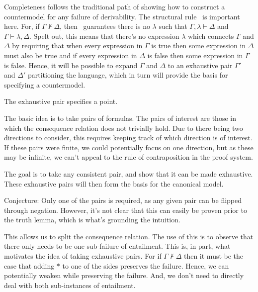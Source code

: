 \documentclass[10pt]{article}
\begin{document}
Completeness follows the traditional path of showing how to construct a countermodel for any failure of derivability.
The structural rule \ is important here.
For, if \(\Gamma \nvdash \Delta\), then \ guarantees there is no \(\lambda\) such that \(\Gamma,\lambda \vdash \Delta\) and \(\Gamma \vdash \lambda,\Delta\).
Spelt out, this means that there's no expression \(\lambda\) which connects \(\Gamma\) and \(\Delta\) by requiring that when every expression in \(\Gamma\) is true then some expression in \(\Delta\) must also be true and if every expression in \(\Delta\) is false then some expression in \(\Gamma\) is false.
Hence, it will be possible to expand \(\Gamma\) and \(\Delta\) to an exhaustive pair \(\Gamma'\) and \(\Delta'\) partitioning the language, which in turn will provide the basis for specifying a countermodel.



The exhaustive pair specifies a point.

\begin{note}
  The basic idea is to take pairs of formulas. The pairs of interest are those in which the consequence relation does not trivially hold. Due to there being two directions to consider, this requires keeping track of which direction is of interest. If these pairs were finite, we could potentially focus on one direction, but as these may be infinite, we can't appeal to the rule of contraposition in the proof system.

  The goal is to take any consistent pair, and show that it can be made exhaustive. These exhaustive pairs will then form the basis for the canonical model.

  Conjecture: Only one of the pairs is required, as any given pair can be flipped through negation. However, it's not clear that this can easily be proven prior to the truth lemma, which is what's grounding the intuition.
\end{note}






This allows us to split the consequence relation.
The use of this is to observe that there only needs to be one sub-failure of entailment.
This is, in part, what motivates the idea of taking exhaustive pairs.
For if \(\Gamma \nvdash \Delta\) then it must be the case that adding \(\ast\) to one of the sides preserves the failure.
Hence, we can potentially weaken while preserving the failure.
And, we don't need to directly deal with both sub-instances of entailment.
\end{document}
